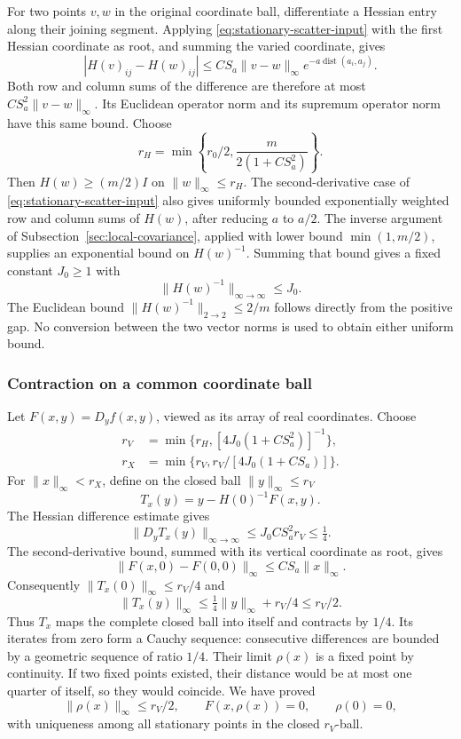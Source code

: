 For two points $v,w$ in the original coordinate ball, differentiate
a Hessian entry along their joining segment. Applying
\eqref{eq:stationary-scatter-input} with the first Hessian coordinate
as root, and summing the varied coordinate, gives
\[
 |H(v)_{ij}-H(w)_{ij}|
   \le C S_a\|v-w\|_\infty
                     e^{-a\operatorname{dist}(a_i,a_j)}.
\]
Both row and column sums of the difference are therefore at most
$CS_a^2\|v-w\|_\infty$. Its Euclidean operator norm and its
supremum operator norm have this same bound. Choose
\[
 r_H=\min\left\{r_0/2,\frac{m}{2(1+CS_a^2)}\right\}.
\]
Then $H(w)\ge(m/2)I$ on $\|w\|_\infty\le r_H$.
The second-derivative case of
\eqref{eq:stationary-scatter-input} also gives uniformly bounded
exponentially weighted row and column sums of $H(w)$, after
reducing $a$ to $a/2$. The inverse argument of
Subsection~\ref{sec:local-covariance}, applied with lower bound
$\min(1,m/2)$, supplies an exponential bound on $H(w)^{-1}$.
Summing that bound gives a fixed constant $J_0\ge1$ with
\begin{equation}\label{eq:stationary-uniform-inverse}
                 \|H(w)^{-1}\|_{\infty\to\infty}\le J_0.
\end{equation}
The Euclidean bound $\|H(w)^{-1}\|_{2\to2}\le2/m$ follows directly
from the positive gap. No conversion between the two vector norms
is used to obtain either uniform bound.

\subsubsection{Contraction on a common coordinate ball}
Let $F(x,y)=D_yf(x,y)$, viewed as its array of real coordinates.
Choose
\begin{align*}
 r_V&=\min\{r_H,[4J_0(1+CS_a^2)]^{-1}\},\\
 r_X&=\min\{r_V,r_V/[4J_0(1+CS_a)]\}.
\end{align*}
For $\|x\|_\infty<r_X$, define on the closed ball
$\|y\|_\infty\le r_V$
\[
                 T_x(y)=y-H(0)^{-1}F(x,y).
\]
The Hessian difference estimate gives
\[
 \|D_yT_x(y)\|_{\infty\to\infty}
       \le J_0CS_a^2r_V\le\tfrac14.
\]
The second-derivative bound, summed with its vertical coordinate
as root, gives
\[
 \|F(x,0)-F(0,0)\|_\infty\le CS_a\|x\|_\infty.
\]
Consequently $\|T_x(0)\|_\infty\le r_V/4$ and
\[
          \|T_x(y)\|_\infty
                   \le\tfrac14\|y\|_\infty+r_V/4\le r_V/2.
\]
Thus $T_x$ maps the complete closed ball into itself and contracts
by $1/4$. Its iterates from zero form a Cauchy sequence: consecutive
differences are bounded by a geometric sequence of ratio $1/4$.
Their limit $\rho(x)$ is a fixed point by continuity. If two fixed
points existed, their distance would be at most one quarter of
itself, so they would coincide. We have proved
\[
 \|\rho(x)\|_\infty\le r_V/2,\qquad F(x,\rho(x))=0,\qquad\rho(0)=0,
\]
with uniqueness among all stationary points in the closed
$r_V$-ball.


